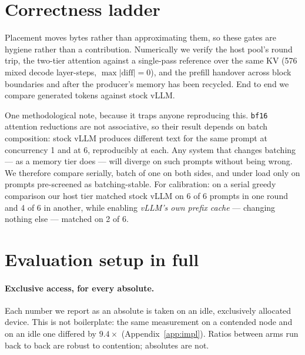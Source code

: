 
\section{Correctness ladder}
\label{app:correct}

Placement moves bytes rather than approximating them, so these gates are
hygiene rather than a contribution. Numerically we verify the host pool's round
trip, the two-tier attention against a single-pass reference over the same KV
(576 mixed decode layer-steps, $\max|\mathrm{diff}| = 0$), and the prefill
handover across block boundaries and after the producer's memory has been
recycled. End to end we compare generated tokens against stock vLLM.

One methodological note, because it traps anyone reproducing this.
\texttt{bf16} attention reductions are not associative, so their result depends
on batch composition: stock vLLM produces different text for the same prompt at
concurrency 1 and at 6, reproducibly at each. Any system that changes batching
--- as a memory tier does --- will diverge on such prompts without being wrong.
We therefore compare serially, batch of one on both sides, and under load only
on prompts pre-screened as batching-stable. For calibration: on a serial greedy
comparison our host tier matched stock vLLM on 6 of 6 prompts in one round and
4 of 6 in another, while enabling \emph{vLLM's own prefix cache} --- changing
nothing else --- matched on 2 of 6.


\section{Evaluation setup in full}
\label{app:setup}

\paragraph{Exclusive access, for every absolute.} Each number we report as an
absolute is taken on an idle, exclusively allocated device. This is not
boilerplate: the same measurement on a contended node and on an idle one
differed by $9.4\times$ (Appendix~\ref{app:impl}). Ratios between arms run back
to back are robust to contention; absolutes are not.

